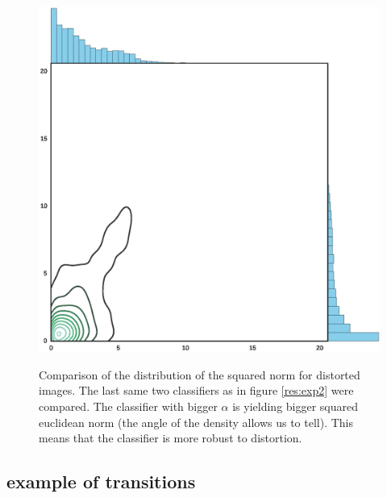 \documentclass{article} %
\begin{document}
\begin{figure}[h!]
\begin{center}
\includegraphics[scale=0.6]{figs/sup_2}
\label{exp:sup_2}
\caption{\small Comparison of the distribution of the squared norm for distorted images. The last same two classifiers as in figure \ref{res:exp2} were compared.
The classifier with bigger $\alpha$ is yielding bigger squared euclidean norm (the angle of the density allows us to tell). This means that the classifier is more robust to distortion.}
\end{center}
\end{figure}

\null
\vfill
\raggedbottom
\pagebreak
\newpage

\subsection{example of transitions}
\end{document}
